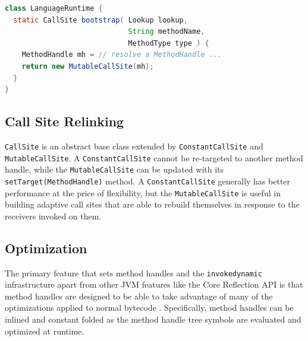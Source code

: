 \begin{lstlisting}[language=Java,caption=A bootstrap method,label=indy-bootstrap-example]
class LanguageRuntime {
  static CallSite bootstrap( Lookup lookup,
                             String methodName,
                             MethodType type ) {
    MethodHandle mh = // resolve a MethodHandle ...
    return new MutableCallSite(mh);
  }
}
\end{lstlisting}

\subsection{Call Site Relinking}

\texttt{CallSite} is an abstract base class extended by \texttt{ConstantCallSite} and \texttt{MutableCallSite}.  A \texttt{ConstantCallSite} cannot be re-targeted to another method handle, while the \texttt{MutableCallSite} can be updated with its \texttt{setTarget(MethodHandle)} method.  A \texttt{ConstantCallSite} generally has better performance at the price of flexibility, but the \texttt{MutableCallSite} is useful in building adaptive call sites that are able to rebuild themselves in response to the receivers invoked on them.

\subsection{Optimization}

The primary feature that sets method handles and the \texttt{invokedynamic} infrastructure apart from other JVM features like the Core Reflection API is that method handles are designed to be able to take advantage of many of the optimizations applied to normal bytecode \cite{direct-method-handles}.  Specifically, method handles can be inlined and constant folded as the method handle tree symbols are evaluated and optimized at runtime.

